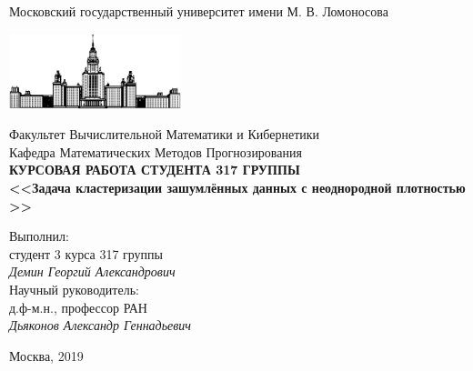 \documentclass[12pt,fleqn]{article}
\begin{document}
\begin{titlepage}
\begin{center}
    Московский государственный университет имени М. В. Ломоносова

    \bigskip
    \includegraphics[width=50mm]{msu.eps}

    \bigskip
    Факультет Вычислительной Математики и Кибернетики\\
    Кафедра Математических Методов Прогнозирования\\[10mm]

    \textsf{\large\bfseries
        КУРСОВАЯ РАБОТА СТУДЕНТА 317 ГРУППЫ\\[10mm]
        <<Задача кластеризации зашумлённых данных с неоднородной плотностью >>
    }\\[10mm]

    \begin{flushright}
        \parbox{0.5\textwidth}{
            Выполнил:\\
            студент 3 курса 317 группы\\
            \emph{Демин Георгий Александрович}\\[5mm]
            Научный руководитель:\\
            д.ф-м.н., профессор РАН\\
            \emph{Дьяконов Александр Геннадьевич}
        }
    \end{flushright}
    
    

    
    \vspace{\fill}
    Москва, 2019
\end{center}
\end{titlepage}
\end{document}
